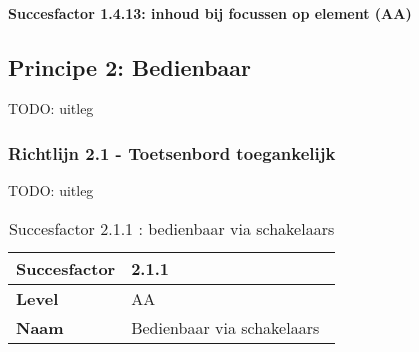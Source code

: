 \paragraph{Succesfactor 1.4.13:  inhoud bij focussen op element (AA)}

\subsection{Principe 2: Bedienbaar}
\label{sec:bedienbaarWCAG}
TODO: uitleg
\subsubsection{Richtlijn 2.1 - Toetsenbord toegankelijk}
TODO: uitleg
\begin{table}[H]
    \centering
    \caption{Succesfactor 2.1.1 : bedienbaar via schakelaars}
    \hspace*{-1cm}\begin{tabular}{|l|p{12cm}|} 
        \hline
        \textbf{Succesfactor}                 & 2.1.1                                                                                                                                                                                                                                                                                                                                                                                                                                                                                                             \\ 
        \hline
        \textbf{Level}                        & AA                                                                                                                                                                                                                                                                                                                                                                                                                                                                                                                 \\ 
        \hline
        \textbf{Naam}                         & Bedienbaar via schakelaars~                                                                                                                                                                                                                                                                                                                                                                                                                                                                                      \\ 

\end{tabular}
\end{table}
